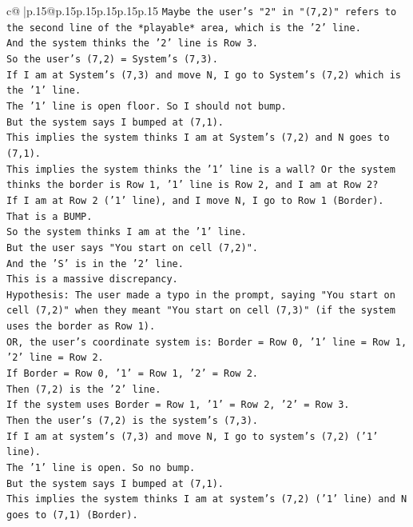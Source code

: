\documentclass{article}
\begin{document}
{\begin{supertabular}{c@{$\;$}|p{.15\linewidth}@{}p{.15\linewidth}p{.15\linewidth}p{.15\linewidth}p{.15\linewidth}p{.15\linewidth}}
{{{\texttt{Maybe the user's "2" in "(7,2)" refers to the second line of the *playable* area, which is the '2' line.} \\
\texttt{And the system thinks the '2' line is Row 3.} \\
\texttt{So the user's (7,2) = System's (7,3).} \\
\texttt{If I am at System's (7,3) and move N, I go to System's (7,2) which is the '1' line.} \\
\texttt{The '1' line is open floor. So I should not bump.} \\
\texttt{But the system says I bumped at (7,1).} \\
\texttt{This implies the system thinks I am at System's (7,2) and N goes to (7,1).} \\
\texttt{This implies the system thinks the '1' line is a wall? Or the system thinks the border is Row 1, '1' line is Row 2, and I am at Row 2?} \\
\texttt{If I am at Row 2 ('1' line), and I move N, I go to Row 1 (Border). That is a BUMP.} \\
\texttt{So the system thinks I am at the '1' line.} \\
\texttt{But the user says "You start on cell (7,2)".} \\
\texttt{And the 'S' is in the '2' line.} \\
\texttt{This is a massive discrepancy.} \\
\texttt{Hypothesis: The user made a typo in the prompt, saying "You start on cell (7,2)" when they meant "You start on cell (7,3)" (if the system uses the border as Row 1).} \\
\texttt{OR, the user's coordinate system is: Border = Row 0, '1' line = Row 1, '2' line = Row 2.} \\
\texttt{If Border = Row 0, '1' = Row 1, '2' = Row 2.} \\
\texttt{Then (7,2) is the '2' line.} \\
\texttt{If the system uses Border = Row 1, '1' = Row 2, '2' = Row 3.} \\
\texttt{Then the user's (7,2) is the system's (7,3).} \\
\texttt{If I am at system's (7,3) and move N, I go to system's (7,2) ('1' line).} \\
\texttt{The '1' line is open. So no bump.} \\
\texttt{But the system says I bumped at (7,1).} \\
\texttt{This implies the system thinks I am at system's (7,2) ('1' line) and N goes to (7,1) (Border).} \\
}}}
\end{supertabular}}
\end{document}
